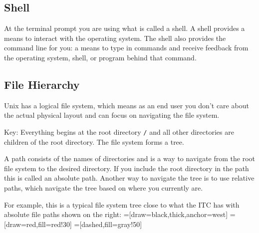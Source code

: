 \documentclass[11pt]{cselabheader}
\begin{document}
\subsection{Shell}
At the terminal prompt you are using what is called a shell. A shell
provides a means to interact with the operating system. The shell also provides
the command line for you: a means to type in commands and receive feedback from
the operating system, shell, or program behind that command.


\subsection{File Hierarchy}

Unix has a logical file system, which means as an end user you don't care about
the actual physical layout and can focus on navigating the file system.

Key: Everything begins at the root directory
\texttt{/} and all other directories are children of the root directory. The
file system forms a tree.

A path consists of the names of directories and is a way to navigate from the
root file system to the desired directory. If you include the root directory in
the path this is called an absolute path. Another way to navigate the tree is to
use relative paths, which navigate the tree based on where you currently are.

For example, this is a typical file system tree close to what the ITC has with
absolute file paths shown on the right:
=[draw=black,thick,anchor=west]
=[draw=red,fill=red!30]
=[dashed,fill=gray!50]

\end{document}
